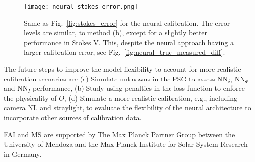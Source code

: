 \documentclass[baaa]{baaa}
\begin{document}
\begin{figure*}[ht]
    \centering
    \texttt{[image: neural\_stokes\_error.png]}
    \caption{Same as Fig.~\ref{fig:stokes_error} for the neural calibration. The error levels are similar, to method (b), except for a slightly better performance in Stokes V. This, despite the neural approach having a larger calibration error, see Fig.~\ref{fig:neural_true_measured_diff}.}
    \label{fig:neural_stokes_error}
\end{figure*}

The future steps to improve the model flexibility to account for more realistic calibration scenarios are (a) Simulate unknowns in the PSG to assess $\text{NN}_\delta$, $\text{NN}_\Phi$ and $\text{NN}_I$ performance, (b) Study using penalties in the loss function to enforce the physicality of $O$, (d) Simulate a more realistic calibration, e.g., including camera NL and straylight, to evaluate the flexibility of the neural architecture to incorporate other sources of calibration data.

\begin{acknowledgement}
FAI and MS are supported by The Max Planck Partner Group between the University of Mendoza and the Max Planck Institute for Solar System Research in Germany.
\end{acknowledgement}




\small

 
\end{document}
